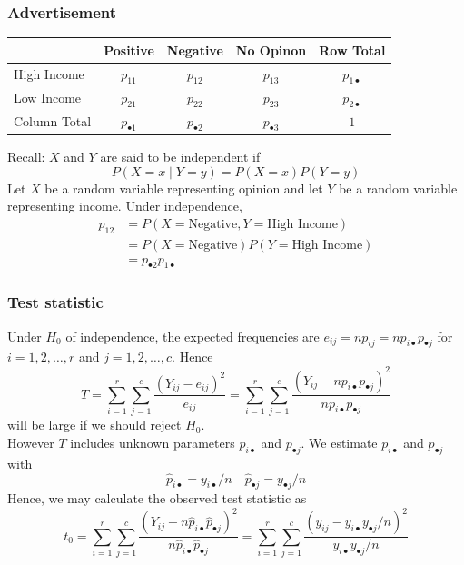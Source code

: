 \documentclass[a4paper]{article}\usepackage[]{graphicx}\usepackage[]{xcolor}
\begin{document}
\subsubsection{Advertisement}
\begin{table}[H]
	\centering
	\begin{tabular}{@{}lccc|c@{}}
	\toprule
				 & Positive  		   & Negative             & No Opinon           & Row Total           \\ \midrule
	High Income  & \( p_{11} \)		   & \( p_{12} \) 	      & \( p_{13} \) 	    & \( p_{1 \bullet} \) \\
	Low Income   & \( p_{21} \) 	   & \( p_{22} \) 	      & \( p_{23} \) 	    & \( p_{2 \bullet} \) \\ \midrule
	Column Total & \( p_{\bullet 1} \) & \( p_{\bullet 2} \)  & \( p_{\bullet 3} \) & \( 1 \) 			  \\ \bottomrule
	\end{tabular}
\end{table}
Recall: \( X \) and \( Y \) are said to be independent if
\[
	P(X = x \mid Y = y) = P(X = x)P(Y = y)
\]
Let \( X \)  be a random variable representing opinion and let \( Y \) be a random variable representing income. Under independence,
\begin{align*}
	p_{12} &= P(X = \text{Negative}, Y = \text{High Income})\\
	       &= P(X = \text{Negative}) P(Y = \text{High Income})\\
		   &= p_{\bullet 2} p_{1 \bullet}
\end{align*}
\subsubsection{Test statistic}
Under \( H_0 \) of independence, the expected frequencies are \( e_{ij} = np_{ij} = np_{i \bullet}p_{\bullet j} \) for \( i = 1,2,\dotsc,r \) and \( j = 1,2,\dotsc,c \). Hence
\[
	T = \sum_{i=1}^{r}\sum_{j=1}^{c} \frac{(Y_{ij}-e_{ij})^2}{e_{ij}} = \sum_{i=1}^{r}\sum_{j=1}^{c} \frac{(Y_{ij}-np_{i \bullet}p_{\bullet j})^2}{np_{i \bullet}p_{\bullet j}}
\]
will be large if we should reject \( H_0 \).\\
However \( T \) includes unknown parameters \( p_{i \bullet} \) and \( p_{\bullet j} \). We estimate \( p_{i \bullet} \) and \( p_{\bullet j} \) with
\[
	\hat{p}_{i \bullet} = y_{i \bullet}/n \quad \hat{p}_{\bullet j} = y_{\bullet j}/n
\]
Hence, we may calculate the observed test statistic as
\[
	t_0 = \sum_{i=1}^{r}\sum_{j=1}^{c} \frac{(Y_{ij}-n \hat{p}_{i \bullet}\hat{p}_{\bullet j})^2}{n \hat{p}_{i \bullet}\hat{p}_{\bullet j}} = \sum_{i=1}^{r}\sum_{j=1}^{c}\frac{(y_{ij} - y_{i \bullet} y_{\bullet j}/n)^2}{y_{i \bullet}y_{\bullet j}/n}
\]
\end{document}
